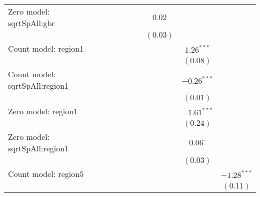 \begin{sidewaystable}
\begin{center}
{\begin{tabular}{l c c c c c c c c c}
Zero model: sqrtSpAll:gbr      &                &               &                &                 &                &                & $0.02$          &                 &                \\
                               &                &               &                &                 &                &                & $(0.03)$        &                 &                \\
Count model: region1           &                &               &                &                 &                &                &                 & $1.26^{***}$    &                \\
                               &                &               &                &                 &                &                &                 & $(0.08)$        &                \\
Count model: sqrtSpAll:region1 &                &               &                &                 &                &                &                 & $-0.26^{***}$   &                \\
                               &                &               &                &                 &                &                &                 & $(0.01)$        &                \\
Zero model: region1            &                &               &                &                 &                &                &                 & $-1.61^{***}$   &                \\
                               &                &               &                &                 &                &                &                 & $(0.24)$        &                \\
Zero model: sqrtSpAll:region1  &                &               &                &                 &                &                &                 & $0.06^{\cdot}$  &                \\
                               &                &               &                &                 &                &                &                 & $(0.03)$        &                \\
Count model: region5           &                &               &                &                 &                &                &                 &                 & $-1.28^{***}$  \\
                               &                &               &                &                 &                &                &                 &                 & $(0.11)$       \\

\end{tabular}}
\end{center}
\end{sidewaystable}
